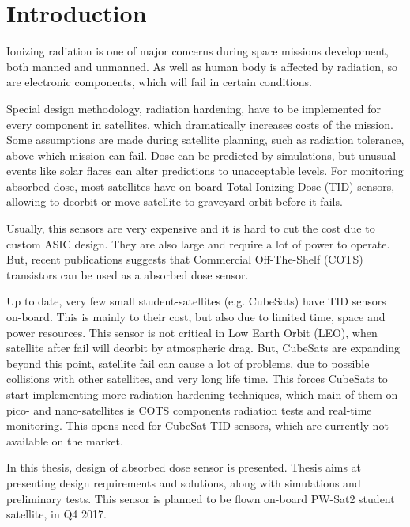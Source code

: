 \chapter{Introduction}
    Ionizing radiation is one of major concerns during space missions development, both manned and unmanned. As well as human body is affected by radiation, so are electronic components, which will fail in certain conditions.

    Special design methodology, radiation hardening, have to be implemented for every component in satellites, which dramatically increases costs of the mission. Some assumptions are made during satellite planning, such as radiation tolerance, above which mission can fail. Dose can be predicted by simulations, but unusual events like solar flares can alter predictions to unacceptable levels. For monitoring absorbed dose, most satellites have on-board Total Ionizing Dose (TID) sensors, allowing to deorbit or move satellite to graveyard orbit before it fails.

    Usually, this sensors are very expensive and it is hard to cut the cost due to custom ASIC design. They are also large and require a lot of power to operate. But, recent publications suggests that Commercial Off-The-Shelf (COTS) transistors can be used as a absorbed dose sensor.

    Up to date, very few small student-satellites (e.g. CubeSats) have TID sensors on-board. This is mainly to their cost, but also due to limited time, space and power resources. This sensor is not critical in Low Earth Orbit (LEO), when satellite after fail will deorbit by atmospheric drag. But, CubeSats are expanding beyond this point, satellite fail can cause a lot of problems, due to possible collisions with other satellites, and very long life time. This forces CubeSats to start implementing more radiation-hardening techniques, which main of them on pico- and nano-satellites is COTS components radiation tests and real-time monitoring. This opens need for CubeSat TID sensors, which are currently not available on the market.

    In this thesis, design of absorbed dose sensor is presented. Thesis aims at presenting design requirements and solutions, along with simulations and preliminary tests. This sensor is planned to be flown on-board PW-Sat2 student satellite, in Q4 2017.

